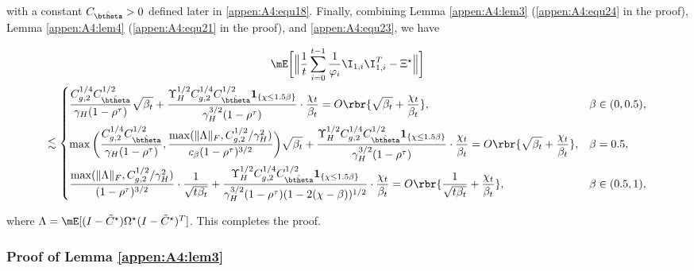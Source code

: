 with a constant $C_{\hat{\btheta}}>0$ defined later in \eqref{appen:A4:equ18}. Finally, combining Lemma \ref{appen:A4:lem3} (\eqref{appen:A4:equ24} in the proof), Lemma \ref{appen:A4:lem4} (\eqref{appen:A4:equ21} in the proof), and \eqref{appen:A4:equ23}, we have
\begin{footnotesize}
\begin{multline}\label{appen:A4:equ27}
\mE\bigg[\Big\|\frac{1}{t}\sum_{i=0}^{t-1}\frac{1}{\varphi_i}\I_{1,i}\I_{1,i}^T-\Xi^\star\Big\|\bigg]\\
\lesssim \begin{dcases}
\frac{C_{g,2}^{1/4}C_{\hat{\btheta}}^{1/2}}{\gamma_H(1-\rho^\tau)}\sqrt{\beta_t} + \frac{\Upsilon_H^{1/2}C_{g,2}^{1/4} C_{\hat{\btheta}}^{1/2} \mathbf{1}_{\{\chi\leq 1.5\beta\}}}{\gamma_H^{3/2}(1-\rho^\tau)}\cdot\frac{\chi_t}{\beta_t}= O\rbr{\sqrt{\beta_t}+ \frac{\chi_t}{\beta_t}}, &\beta\in(0,0.5),\\
\max\bigg(\frac{C_{g,2}^{1/4}C_{\hat{\btheta}}^{1/2}}{\gamma_H(1-\rho^\tau)}, \frac{\max(\|\Lambda\|_F, C_{g,2}^{1/2}/\gamma_H^2)}{c_{\beta}(1-\rho^\tau)^{3/2}}\bigg)\sqrt{\beta_t} + \frac{\Upsilon_H^{1/2}C_{g,2}^{1/4} C_{\hat{\btheta}}^{1/2} \mathbf{1}_{\{\chi\leq 1.5\beta\}}}{\gamma_H^{3/2}(1-\rho^\tau)}\cdot\frac{\chi_t}{\beta_t}=O\rbr{\sqrt{\beta_t}+ \frac{\chi_t}{\beta_t}} , &\beta=0.5,\\
\frac{\max(\|\Lambda\|_F, C_{g,2}^{1/2}/\gamma_H^2)}{(1-\rho^\tau)^{3/2}}\cdot \frac{1}{\sqrt{t\beta_t}} + \frac{\Upsilon_H^{1/2}C_{g,2}^{1/4} C_{\hat{\btheta}}^{1/2} \mathbf{1}_{\{\chi\leq 1.5\beta\}}}{\gamma_H^{3/2}(1-\rho^\tau)(1-2(\chi-\beta))^{1/2}}\cdot\frac{\chi_t}{\beta_t} =O\rbr{\frac{1}{\sqrt{t\beta_t}}+ \frac{\chi_t}{\beta_t}}, &\beta\in(0.5,1),
\end{dcases}
\end{multline}
\end{footnotesize}
\hskip -3.5pt where $\Lambda = \mE[(I- \tilde{C}^\star)\Omega^\star(I-\tilde{C}^\star)^T]$. This completes the proof.


\subsubsection{Proof of Lemma \ref{appen:A4:lem3}}\label{pf:tildeI1}

